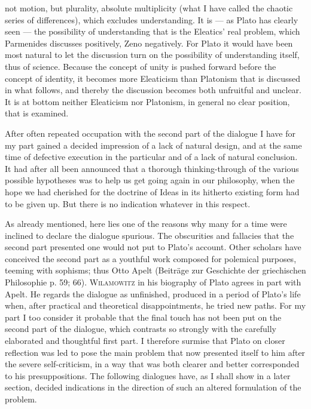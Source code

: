 \documentclass[12pt,a4paper,openany]{book}
\newcommand{\opage}[1]{\marginnote{\footnotesize\textit{[#1]}}}
\begin{document}
not motion, but plurality, absolute multiplicity
(what I have called the chaotic series of differences), which
excludes understanding. It is --- as Plato has clearly seen ---
the possibility of understanding that is the Eleatics’ real problem,
which Parmenides discusses positively, Zeno negatively. For Plato
it would have been most natural to let the discussion turn
on the possibility of understanding itself, thus of science.
Because the concept of unity is pushed forward before the concept of identity,
it becomes more Eleaticism than Platonism that is
discussed in what follows, and thereby the discussion becomes both
unfruitful and unclear. It is at bottom neither Eleaticism
nor Platonism, in general no clear position, that is examined.


After often repeated occupation with the second part of the dialogue
I have for my part gained a decided impression of
a lack of natural design, and at the same time of defective
\setcounter{footnote}{0}%
\opage{29}execution in the particular and of a lack of natural conclusion.
It had after all been announced that a thorough thinking-through of
the various possible hypotheses was to help us get going
again in our philosophy, when the hope we had cherished for the doctrine of Ideas
in its hitherto existing form had to be given up. But there
is no indication whatever in this respect.

As already mentioned, here lies one of the reasons why
many for a time were inclined to declare the dialogue
spurious. The obscurities and fallacies that the second part presented
one would not put to Plato’s account. Other scholars
have conceived the second part as a youthful work
composed for polemical purposes, teeming with sophisms; thus
Otto Apelt (Beiträge zur Geschichte der griechischen Philosophie
p. 59; 66). \textsc{Wilamowitz} in his biography of Plato
agrees in part with Apelt. He regards the dialogue as unfinished,
produced in a period of Plato’s life when, after
practical and theoretical disappointments, he tried new paths. For my
part I too consider it probable that the final touch
has not been put on the second part of the dialogue, which
contrasts so strongly with the carefully elaborated
and thoughtful first part. I therefore surmise that Plato on
closer reflection was led to pose the main problem
that now presented itself to him after the severe self-criticism,
in a way that was both clearer and better corresponded
to his presuppositions. The following dialogues have, as
I shall show in a later section, decided indications in the direction
of such an altered formulation of the problem.
\end{document}
